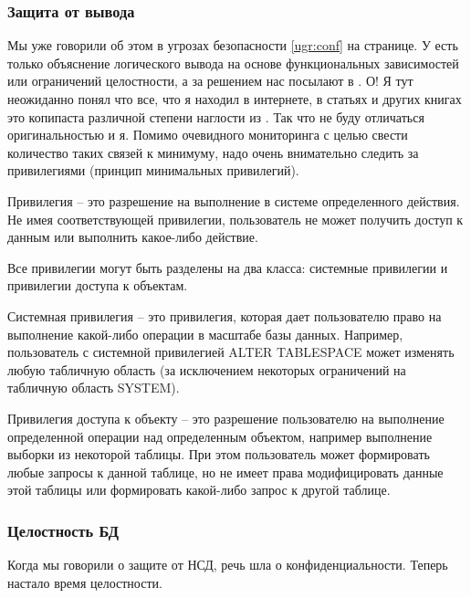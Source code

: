 \subsubsection{Защита от вывода}
Мы уже говорили об этом в угрозах безопасности \ref{ugr:conf} на \pageref{ugr:conf} странице. У \autocite{Ytebov2008} есть только объяснение логического вывода на основе функциональных зависимостей или ограничений целостности, а за решением нас посылают в \autocite{Smirnov2007}. О! Я тут неожиданно понял что все, что я находил в интернете, в статьях и других книгах это копипаста различной степени наглости из \autocite{Smirnov2007}. Так что не буду отличаться оригинальностью и я. Помимо очевидного мониторинга с целью свести количество таких связей к минимуму, надо очень внимательно следить за привилегиями (принцип минимальных привилегий).
\begin{grayquote}
	Привилегия -- это разрешение на выполнение в системе определенного действия. Не имея соответствующей привилегии, пользователь не может получить доступ к данным или выполнить какое-либо действие.
\end{grayquote}

Все привилегии могут быть разделены на два класса: системные привилегии и привилегии доступа к объектам.

\begin{grayquote}
	Системная привилегия -- это привилегия, которая дает пользователю право на выполнение какой-либо операции в масштабе базы данных. Например, пользователь с системной привилегией ALTER TABLESPACE может изменять любую табличную область (за исключением некоторых ограничений на табличную область SYSTEM).
	
	Привилегия доступа к объекту -- это разрешение пользователю на выполнение определенной операции над определенным объектом, например выполнение выборки из некоторой таблицы.
	При этом пользователь может формировать любые запросы к данной таблице, но не имеет права модифицировать данные этой таблицы или формировать какой-либо запрос к другой таблице.
\end{grayquote}

\subsubsection{Целостность БД}
Когда мы говорили о защите от НСД, речь шла о конфиденциальности. Теперь настало время целостности. 

